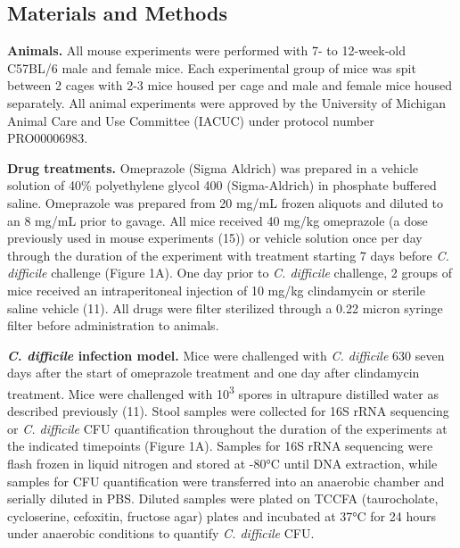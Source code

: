 \documentclass[11pt,]{article}
\begin{document}
\newpage

\subsection{Materials and Methods}\label{materials-and-methods}

\textbf{Animals.} All mouse experiments were performed with 7- to
12-week-old C57BL/6 male and female mice. Each experimental group of
mice was spit between 2 cages with 2-3 mice housed per cage and male and
female mice housed separately. All animal experiments were approved by
the University of Michigan Animal Care and Use Committee (IACUC) under
protocol number PRO00006983.

\textbf{Drug treatments.} Omeprazole (Sigma Aldrich) was prepared in a
vehicle solution of 40\% polyethylene glycol 400 (Sigma-Aldrich) in
phosphate buffered saline. Omeprazole was prepared from 20 mg/mL frozen
aliquots and diluted to an 8 mg/mL prior to gavage. All mice received 40
mg/kg omeprazole (a dose previously used in mouse experiments (15)) or
vehicle solution once per day through the duration of the experiment
with treatment starting 7 days before \emph{C. difficile} challenge
(Figure 1A). One day prior to \emph{C. difficile} challenge, 2 groups of
mice received an intraperitoneal injection of 10 mg/kg clindamycin or
sterile saline vehicle (11). All drugs were filter sterilized through a
0.22 micron syringe filter before administration to animals.

\textbf{\emph{C. difficile} infection model.} Mice were challenged with
\emph{C. difficile} 630 seven days after the start of omeprazole
treatment and one day after clindamycin treatment. Mice were challenged
with 10\textsuperscript{3} spores in ultrapure distilled water as
described previously (11). Stool samples were collected for 16S rRNA
sequencing or \emph{C. difficile} CFU quantification throughout the
duration of the experiments at the indicated timepoints (Figure 1A).
Samples for 16S rRNA sequencing were flash frozen in liquid nitrogen and
stored at -80°C until DNA extraction, while samples for CFU
quantification were transferred into an anaerobic chamber and serially
diluted in PBS. Diluted samples were plated on TCCFA (taurocholate,
cycloserine, cefoxitin, fructose agar) plates and incubated at 37°C for
24 hours under anaerobic conditions to quantify \emph{C. difficile} CFU.
\end{document}
